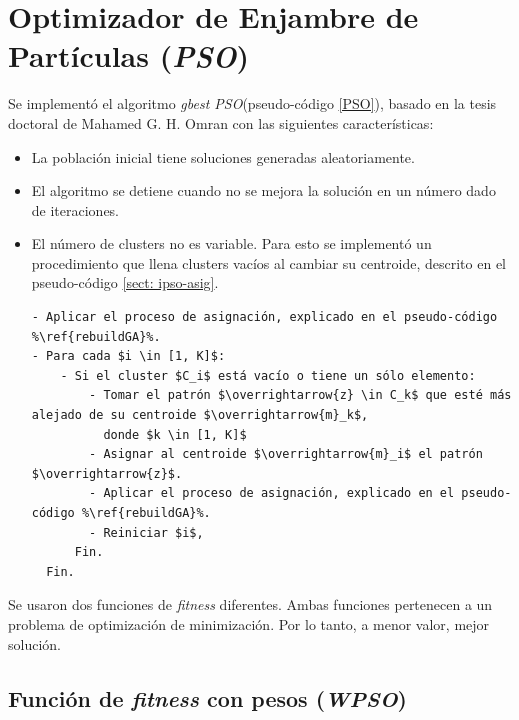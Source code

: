 \section{Optimizador de Enjambre de Partículas (\emph{PSO})}  \label{sect:ipso}

    Se implementó el algoritmo \emph{gbest PSO}(pseudo-código \ref{PSO}), basado en la tesis doctoral de
Mahamed G. H. Omran \cite{PSO_0} con las siguientes características:
\begin{itemize}
    \item La población inicial tiene soluciones generadas aleatoriamente.
    \item El algoritmo se detiene cuando no se mejora la solución en un
número dado de iteraciones.
	\item El número de clusters no es variable. Para esto se implementó un
procedimiento que llena clusters vacíos al cambiar su centroide, descrito en
el pseudo-código \ref{sect: ipso-asig}.
\begin{lstlisting}[float=h!, caption={Asignación de nuevo centroide}, label={sect: ipso-asig}]
- Aplicar el proceso de asignación, explicado en el pseudo-código %\ref{rebuildGA}%.
- Para cada $i \in [1, K]$:
    - Si el cluster $C_i$ está vacío o tiene un sólo elemento:
        - Tomar el patrón $\overrightarrow{z} \in C_k$ que esté más alejado de su centroide $\overrightarrow{m}_k$,
          donde $k \in [1, K]$
        - Asignar al centroide $\overrightarrow{m}_i$ el patrón $\overrightarrow{z}$.
        - Aplicar el proceso de asignación, explicado en el pseudo-código %\ref{rebuildGA}%.
        - Reiniciar $i$,
      Fin.
  Fin.
\end{lstlisting}
\end{itemize}

    Se usaron dos funciones de \emph{fitness} diferentes. Ambas funciones
pertenecen a un problema de optimización de minimización. Por lo tanto, a menor
valor, mejor solución.
    
\subsection{Función de \emph{fitness} con pesos (\emph{WPSO})}\label{sect:iwpso}

